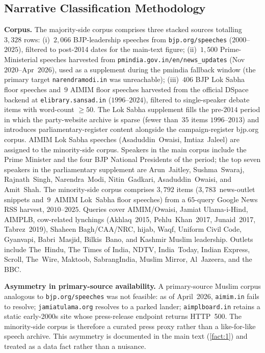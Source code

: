 

\subsection{Narrative Classification Methodology} \label{app:narrative_classification}

\textbf{Corpus.} The majority-side corpus comprises three stacked sources
totalling $3{,}328$ rows: (i)~$2{,}066$ BJP-leadership speeches from
\texttt{bjp.org/speeches} ($2000$--$2025$), filtered to post-2014 dates for
the main-text figure; (ii)~$1{,}500$ Prime-Ministerial speeches harvested
from \texttt{pmindia.gov.in/en/news\_updates} (Nov~$2020$--Apr~$2026$), used
as a supplement during the pmindia fallback window (the primary target
\texttt{narendramodi.in} was unreachable); (iii)~$406$ BJP Lok Sabha floor
speeches and~$9$ AIMIM floor speeches harvested from the official DSpace
backend at \texttt{elibrary.sansad.in} ($1996$--$2024$), filtered to
single-speaker debate items with word-count $\geq 50$. The Lok Sabha
supplement fills the pre-$2014$ period in which the party-website archive
is sparse (fewer than~$35$ items $1996$--$2013$) and introduces
parliamentary-register content alongside the campaign-register bjp.org
corpus. AIMIM Lok Sabha speeches (Asaduddin~Owaisi, Imtiaz~Jaleel) are
assigned to the minority-side corpus. Speakers in the main corpus include
the Prime Minister and the four BJP National Presidents of the period; the
top seven speakers in the parliamentary supplement are Arun~Jaitley,
Sushma~Swaraj, Rajnath~Singh, Narendra~Modi, Nitin~Gadkari,
Asaduddin~Owaisi, and Amit~Shah. The minority-side corpus comprises
$3{,}792$ items ($3{,}783$~news-outlet snippets and~$9$~AIMIM Lok~Sabha
floor speeches) from a $65$-query Google News RSS harvest, $2010$--$2025$.
Queries cover AIMIM/Owaisi, Jamiat Ulama-i-Hind, AIMPLB, cow-related
lynchings (Akhlaq~2015, Pehlu~Khan~2017, Junaid~2017, Tabrez~2019), Shaheen
Bagh/CAA/NRC, hijab, Waqf, Uniform Civil Code, Gyanvapi, Babri~Masjid,
Bilkis~Bano, and Kashmir Muslim leadership. Outlets include The~Hindu, The
Times of India, NDTV, India~Today, Indian Express, Scroll, The~Wire,
Maktoob, SabrangIndia, Muslim Mirror, Al~Jazeera, and the BBC.

\textbf{Asymmetry in primary-source availability.} A primary-source Muslim
corpus analogous to \texttt{bjp.org/speeches} was not feasible: as of
April~2026, \texttt{aimim.in} fails to resolve; \texttt{jamiatulama.org}
resolves to a parked lander; \texttt{aimplboard.in} retains a static
early-2000s site whose press-release endpoint returns HTTP~500. The
minority-side corpus is therefore a curated press proxy rather than a
like-for-like speech archive. This asymmetry is documented in the main text
(\autoref{fact:1}) and treated as a data fact rather than a
nuisance.

